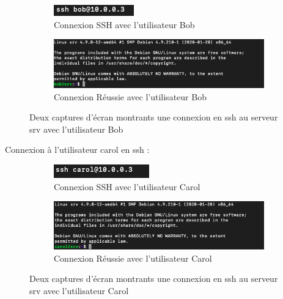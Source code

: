 \documentclass[12pt]{article}
\begin{document}
\begin{figure}[h]
  \centering
  \begin{subfigure}{0.45\textwidth}
    \centering
    \includegraphics[width=\textwidth]{Image-TD-SSH-1/SSH-Bob.png}
    \caption{Connexion SSH avec l'utilisateur Bob}
  \end{subfigure}
  \vspace{0.9cm} %
  \begin{subfigure}{0.45\textwidth}
    \centering
    \includegraphics[width=\textwidth]{Image-TD-SSH-1/Connexion-SSH-Bob.png}
    \caption{Connexion Réussie avec l'utilisateur Bob}
  \end{subfigure}
  \caption{Deux captures d'écran montrants une connexion en ssh au serveur srv avec l'utilisateur Bob}
\end{figure}

\vspace{0.3cm}

Connexion à l'utilisateur carol en ssh  : 

\vspace{0.3cm}

\begin{figure}[h]
  \centering
  \begin{subfigure}{0.45\textwidth}
    \centering
    \includegraphics[width=\textwidth]{Image-TD-SSH-1/SSH-Carol.png}
    \caption{Connexion SSH avec l'utilisateur Carol}
  \end{subfigure}
  \vspace{0.9cm} %
  \begin{subfigure}{0.45\textwidth}
    \centering
    \includegraphics[width=\textwidth]{Image-TD-SSH-1/Connexion-SSH-Carol.png}
    \caption{Connexion Réussie avec l'utilisateur Carol}
  \end{subfigure}
  \caption{Deux captures d'écran montrants une connexion en ssh au serveur srv avec l'utilisateur Carol}
\end{figure}
\end{document}
